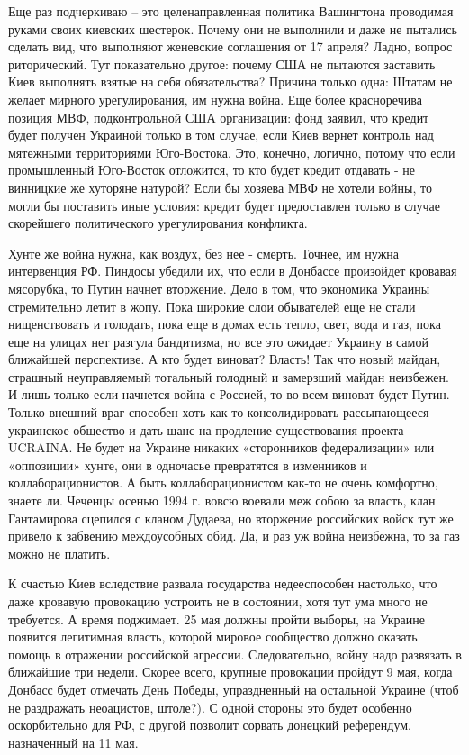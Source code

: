 Еще раз подчеркиваю – это целенаправленная политика Вашингтона проводимая
руками своих киевских шестерок. Почему они не выполнили и даже не пытались
сделать вид, что выполняют женевские соглашения от 17 апреля? Ладно, вопрос
риторический. Тут показательно другое: почему США не пытаются заставить Киев
выполнять взятые на себя обязательства? Причина только одна: Штатам не желает
мирного урегулирования, им нужна война. Еще более красноречива позиция МВФ,
подконтрольной США организации: фонд заявил, что кредит будет получен Украиной
только в том случае, если Киев вернет контроль над мятежными территориями
Юго-Востока. Это, конечно, логично, потому что если промышленный Юго-Восток
отложится, то кто будет кредит отдавать - не винницкие же хуторяне натурой?
Если бы хозяева МВФ не хотели войны, то могли бы поставить иные условия: кредит
будет предоставлен только в случае скорейшего политического урегулирования
конфликта.

Хунте же война нужна, как воздух, без нее - смерть. Точнее, им нужна
интервенция РФ. Пиндосы убедили их, что если в Донбассе произойдет кровавая
мясорубка, то Путин начнет вторжение. Дело в том, что экономика Украины
стремительно летит в жопу. Пока широкие слои обывателей еще не стали
нищенствовать и голодать, пока еще в домах есть тепло, свет, вода и газ, пока
еще на улицах нет разгула бандитизма, но все это ожидает Украину в самой
ближайшей перспективе. А кто будет виноват? Власть! Так что новый майдан,
страшный неуправляемый тотальный голодный и замерзший майдан неизбежен. И лишь
только  если начнется война с Россией, то во всем виноват будет Путин. Только
внешний враг способен хоть как-то консолидировать рассыпающееся украинское
общество и  дать шанс на продление существования проекта UCRAINA. Не будет  на
Украине никаких «сторонников федерализации» или «оппозиции» хунте, они в
одночасье превратятся в изменников и коллаборационистов. А быть
коллаборационистом как-то не очень комфортно, знаете ли. Чеченцы осенью 1994 г.
вовсю воевали меж собою за власть, клан Гантамирова сцепился с кланом Дудаева,
но вторжение российских войск тут же привело к забвению междоусобных обид. Да,
и раз уж война неизбежна, то за газ можно не платить.

К счастью Киев вследствие развала государства недееспособен настолько, что даже
кровавую провокацию устроить не в состоянии, хотя тут ума много не требуется. А
время поджимает. 25 мая должны пройти выборы, на Украине появится легитимная
власть, которой мировое сообщество должно оказать помощь в отражении российской
агрессии. Следовательно, войну надо развязать в ближайшие три недели. Скорее
всего, крупные провокации пройдут 9 мая, когда Донбасс будет отмечать День
Победы, упраздненный на остальной Украине (чтоб не раздражать неоацистов,
штоле?). С одной стороны это будет особенно оскорбительно для РФ, с другой
позволит сорвать донецкий референдум, назначенный на 11 мая.

